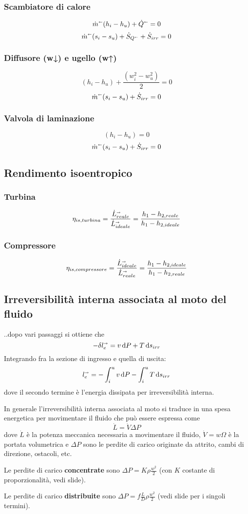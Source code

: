 \subsubsection{Scambiatore di calore}
\[ \dot{m}^\shortleftarrow (h_i - h_u) + \dot{Q}^\shortleftarrow = 0 \]
\[ \dot{m}^\shortleftarrow (s_i - s_u) + \dot{S}_{Q^\shortleftarrow} + \dot{S}_{irr} = 0 \]

\subsubsection{Diffusore (w↓) e ugello (w↑)}
\[  (h_i - h_u) + \frac{(w_i^2 - w_u^2)}{2} = 0 \]
\[ \dot{m}^\shortleftarrow (s_i - s_u) + \dot{S}_{irr} = 0 \]

\subsubsection{Valvola di laminazione}
\[  (h_i - h_u) = 0 \]
\[ \dot{m}^\shortleftarrow (s_i - s_u) + \dot{S}_{irr} = 0 \]

\subsection{Rendimento isoentropico}
\subsubsection{Turbina}
\[ \eta_{is,turbina} = \frac{\dot{L}_{reale}^\shortrightarrow}{\dot{L}_{ideale}^\shortrightarrow} = \frac{h_1 - h_{2,reale}}{h_1 - h_{2,ideale}} \]

\subsubsection{Compressore}
\[ \eta_{is,compressore} = \frac{\dot{L}_{ideale}^\shortrightarrow}{\dot{L}_{reale}^\shortrightarrow} = \frac{h_1 - h_{2,ideale}}{h_1 - h_{2,reale}} \]

\subsection{Irreversibilità interna associata al moto del fluido}
..dopo vari passaggi si ottiene che
\[ -\delta l_e^\shortrightarrow = v\dd{P} + T\dd{s_{irr}} \]
Integrando fra la sezione di ingresso e quella di uscita:
\[ l_e^\shortrightarrow = -\int_i^u v\dd{P} -\int_i^u T\dd{s_{irr}} \]
dove il secondo termine è l'energia dissipata per irreversibilità interna.

In generale l’irreversibilità interna associata al moto si traduce in una spesa energetica per movimentare il fluido che può essere espressa come
\[
    \dot{L} = \dot{V} \Delta P 
\]
dove $\dot{L}$ è la potenza meccanica necessaria a movimentare il fluido, $\dot{V} = w \Omega$ è la portata volumetrica e $\Delta P$ sono le perdite di carico originate da attrito, cambi di direzione, ostacoli, etc.\newline

Le perdite di carico \textbf{concentrate} sono $\Delta P = K \rho \frac{w^2}{2}$ (con $K$ costante di proporzionalità, vedi slide).

Le perdite di carico \textbf{distribuite} sono $\Delta P = f \frac{L}{D} \rho \frac{w^2}{2}$ (vedi slide per i singoli termini).
